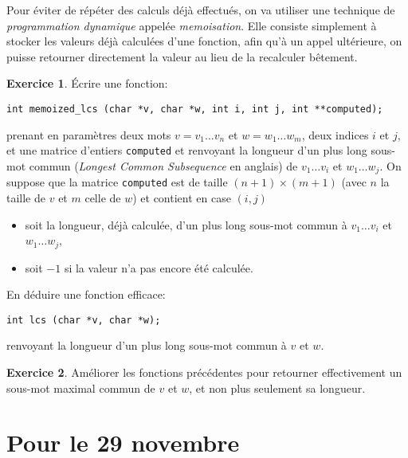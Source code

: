\documentclass[french,a4paper]{article}
\theoremstyle{definition}
\newtheorem{exercise}{Exercice}
\theoremstyle{remark}
\newcommand{\inlinec}[1]{\lstinline[style=C]°#1°}
\begin{document}
\medskip

Pour éviter de répéter des calculs déjà effectués, on va utiliser une
technique de {\em programmation dynamique} appelée {\em
  memoisation}. Elle consiste simplement à stocker les valeurs déjà
calculées d'une fonction, afin qu'à un appel ultérieure, on puisse
retourner directement la valeur au lieu de la recalculer bêtement.
\begin{exercise}
  \'Ecrire une fonction:
\begin{lstlisting}
int memoized_lcs (char *v, char *w, int i, int j, int **computed); 
\end{lstlisting}
  prenant en paramètres deux mots $v=v_1\dots v_{n}$ et
  $w = w_1\dots w_{m}$, deux indices $i$ et $j$, et une matrice
  d'entiers \inlinec{computed} et renvoyant la longueur d'un plus long
  sous-mot commun ({\em Longest Common Subsequence} en anglais) de
  $v_1\dots v_i$ et $w_1\dots w_j$. On suppose que la matrice
  \inlinec{computed} est de taille $(n+1) \times (m+1)$ (avec $n$ la
  taille de $v$ et $m$ celle de $w$) et contient en case $(i,j)$
  \begin{itemize}
  \item soit la longueur, déjà calculée, d'un plus long sous-mot
    commun à $v_1\dots v_i$ et $w_1\dots w_j$,
  \item soit $-1$ si la valeur n'a pas encore été calculée.
  \end{itemize}

  En déduire une fonction efficace:
\begin{lstlisting}
int lcs (char *v, char *w);
\end{lstlisting}
  renvoyant la longueur d'un plus long sous-mot commun à $v$ et $w$.
\end{exercise}

\begin{exercise}
  Améliorer les fonctions précédentes pour retourner effectivement un
  sous-mot maximal commun de $v$ et $w$, et non plus seulement sa
  longueur.
\end{exercise}

\section{Pour le 29 novembre}
\label{sec:homeworks}
\end{document}
